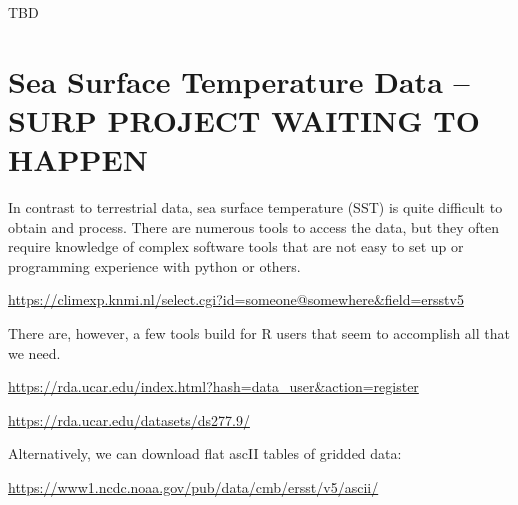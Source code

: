 \documentclass{article}\usepackage[]{graphicx}\usepackage[]{color}
\begin{document}
TBD

\section{Sea Surface Temperature Data -- SURP PROJECT WAITING TO HAPPEN}

In contrast to terrestrial data, sea surface temperature (SST) is quite difficult to obtain and process. There are numerous tools to access the data, but they often require knowledge of complex software tools that are not easy to set up or programming experience with python or others.

\url{https://climexp.knmi.nl/select.cgi?id=someone@somewhere&field=ersstv5}

There are, however, a few tools build for R users that seem to accomplish all that we need. 

\url{https://rda.ucar.edu/index.html?hash=data_user&action=register}

\url{https://rda.ucar.edu/datasets/ds277.9/}

Alternatively, we can download flat ascII tables of gridded data:

\url{https://www1.ncdc.noaa.gov/pub/data/cmb/ersst/v5/ascii/}
\end{document}
